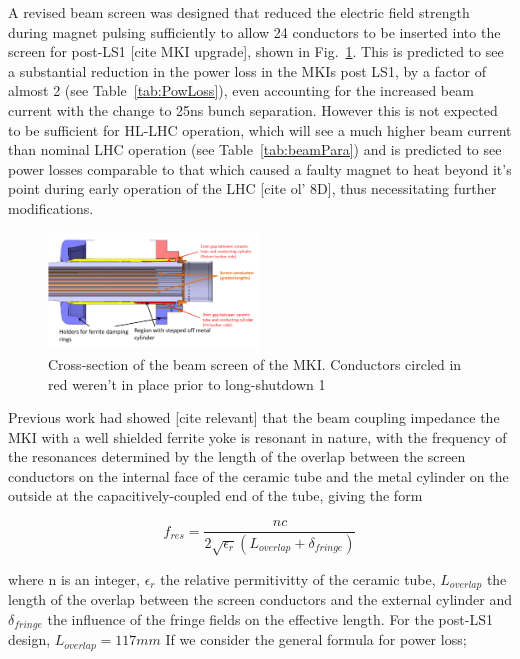 \documentclass[a4paper,
              ]{jacow}
\begin{document}
A revised beam screen was designed that reduced the electric field strength during magnet pulsing sufficiently to allow 24 conductors to be inserted into the screen for post-LS1 [cite MKI upgrade], shown in Fig.~\ref{fig:BeamScreenPostLS1}. This is predicted to see a substantial reduction in the power loss in the MKIs post LS1, by a factor of almost 2 (see Table~\ref{tab:PowLoss}), even accounting for the increased beam current with the change to 25ns bunch separation. However this is not expected to be sufficient for HL-LHC operation, which will see a much higher beam current than nominal LHC operation (see Table~\ref{tab:beamPara}) and is predicted to see power losses comparable to that which caused a faulty magnet to heat beyond it's point during early operation of the LHC [cite ol' 8D], thus necessitating further modifications.

\begin{figure}
\begin{center}
\includegraphics[width=0.5\textwidth]{beamScreenCrossSectionLabelled.pdf}
\caption{Cross-section of the beam screen of the MKI. Conductors circled in red weren't in place prior to long-shutdown 1}
\label{fig:BeamScreenPostLS1}
\end{center}
\end{figure}

Previous work had showed [cite relevant] that the beam coupling impedance the MKI with a well shielded ferrite yoke is resonant in nature, with the frequency of the resonances determined by the length of the overlap between the screen conductors on the internal face of the ceramic tube and the metal cylinder on the outside at the capacitively-coupled end of the tube, giving the form

\begin{equation}
f_{res} = \frac{nc}{2\sqrt{\epsilon_{r}}\left( L_{overlap}+ \delta_{fringe} \right)}
\end{equation}

where n is an integer, $\epsilon_{r}$ the relative permitivitty of the ceramic tube, $L_{overlap}$ the length of the overlap between the screen conductors and the external cylinder and $\delta_{fringe}$ the influence of the fringe fields on the effective length. For the post-LS1 design, $L_{overlap} = 117mm$ If we consider the general formula for power loss;
\end{document}
